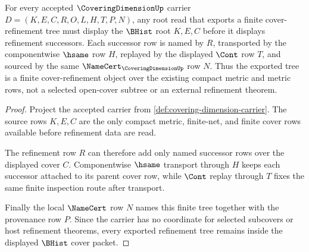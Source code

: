 \begin{theorem}
\label{thm:coveringdimension-root-cover-refinement-tree}
For every accepted $\CoveringDimensionUp$ carrier $D=(K,E,C,R,O,L,H,T,P,N)$, any root read that exports a finite cover-refinement tree must display the $\BHist$ root $K,E,C$ before it displays refinement successors. Each successor row is named by $R$, transported by the componentwise $\hsame$ row $H$, replayed by the displayed $\Cont$ row $T$, and sourced by the same $\NameCert_{\CoveringDimensionUp}$ row $N$. Thus the exported tree is a finite cover-refinement object over the existing compact metric and metric rows, not a selected open-cover subtree or an external refinement theorem.
\end{theorem}
\begin{proof}
Project the accepted carrier from \autoref{def:covering-dimension-carrier}. The source rows $K,E,C$ are the only compact metric, finite-net, and finite cover rows available before refinement data are read.

The refinement row $R$ can therefore add only named successor rows over the displayed cover $C$. Componentwise $\hsame$ transport through $H$ keeps each successor attached to its parent cover row, while $\Cont$ replay through $T$ fixes the same finite inspection route after transport.

Finally the local $\NameCert$ row $N$ names this finite tree together with the provenance row $P$. Since the carrier has no coordinate for selected subcovers or host refinement theorems, every exported refinement tree remains inside the displayed $\BHist$ cover packet.
\end{proof}

